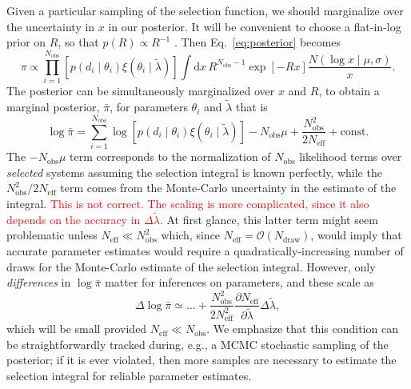 \documentclass[modern]{aastex62}
\newcommand{\dd}{\mathrm{d}}
\newcommand{\fixme}[1]{\textcolor{red}{#1}}
\newcommand{\Ndraw}{N_\mathrm{draw}}
\newcommand{\Neff}{N_\mathrm{eff}}
\newcommand{\Nobs}{N_\mathrm{obs}}
\begin{document}
Given a particular sampling of the selection function, we should marginalize
over the uncertainty in $x$ in our posterior.  It will be convenient to choose a
flat-in-log prior on $R$, so that $p(R) \propto R^{-1}$
\citep{Fishbach2018,Mandel2018}.  Then Eq.\ \eqref{eq:posterior} becomes
%
\begin{equation}
  \label{eq:posterior-integrated}
    \pi \propto \prod_{i = 1}^{\Nobs} \left[ p\left( d_i \mid \theta_i \right) \xi\left( \theta_i \mid \tilde{\lambda} \right) \right] \int \dd x \, R^{\Nobs - 1} \exp\left[ -R x \right] \frac{N\left( \log x \mid \mu, \sigma\right)}{x}.
\end{equation}
%
The posterior can be simultaneously marginalized over $x$ and $R$, to obtain a
marginal posterior, $\bar{\pi}$, for parameters $\theta_i$ and $\tilde{\lambda}$
that is
%
\begin{equation}
  \log \bar{\pi} = \sum_{i = 1}^{\Nobs} \log \left[ p\left( d_i \mid \theta_i \right) \xi\left( \theta_i \mid \tilde{\lambda} \right) \right] - \Nobs \mu + \frac{\Nobs^2}{2 \Neff} + \mathrm{const}.
\end{equation}
%
The $-\Nobs\mu$ term corresponds to the normalization of $\Nobs$ likelihood
terms over \emph{selected} systems \citep{Mandel2018} assuming the selection
integral is known perfectly, while the $\Nobs^2/2\Neff$ term comes from the
Monte-Carlo uncertainty in the estimate of the integral.  \fixme{This is not
correct.  The scaling is more complicated, since it also depends on the accuracy
in $\Delta \tilde{\lambda}$.}  At first glance, this latter term might seem
problematic unless $\Neff \ll \Nobs^2$ which, since $\Neff = \mathcal{O}\left(
\Ndraw \right)$, would imply that accurate parameter estimates would require a
quadratically-increasing number of draws for the Monte-Carlo estimate of the
selection integral.  However, only \emph{differences} in $\log \bar{\pi}$ matter
for inferences on parameters, and these scale as
%
\begin{equation}
    \Delta \log \bar{\pi} \simeq \ldots + \frac{\Nobs^2}{2\Neff^2} \frac{\partial \Neff}{\partial \tilde{\lambda}} \Delta \tilde{\lambda},
\end{equation}
%
which will be small provided $\Neff \ll \Nobs$.  We emphasize that this
condition can be straightforwardly tracked during, e.g., a MCMC stochastic
sampling of the posterior; if it is ever violated, then more samples are
necessary to estimate the selection integral for reliable parameter estimates.
\end{document}
